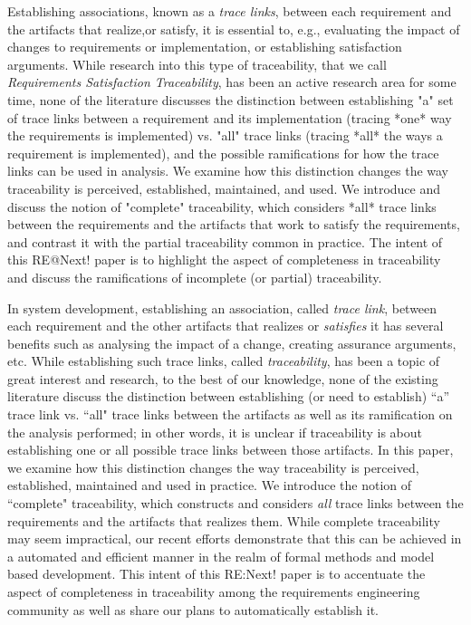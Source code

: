 Establishing associations, known as a\emph{ trace links}, between each requirement
and the artifacts that realize,or satisfy, it is essential to, e.g.,
evaluating the impact of changes to requirements or implementation, or
establishing satisfaction arguments. While research into this type of
traceability, that we call \emph{Requirements Satisfaction Traceability},
 has been an active research area for some time, none of the
literature discusses the distinction between establishing "a" set of trace
links between a requirement and its implementation (tracing *one* way the
requirements is implemented) vs. "all" trace links (tracing *all* the ways a
requirement is implemented), and the possible ramifications for how the trace
links can be used in analysis. We examine how this distinction changes the way
traceability is perceived, established, maintained, and used.  We introduce
and discuss the notion of "complete" traceability, which considers *all* trace
links between the requirements and the artifacts that work to satisfy the
requirements, and contrast it with the partial traceability common in
practice.  The intent of this RE@Next! paper is to highlight the aspect of
completeness in traceability and discuss the ramifications of incomplete (or
partial) traceability.

\iffalse

In system development, establishing an association, called \emph{trace link}, between each requirement and the other artifacts that realizes or \emph{satisfies} it has several benefits such as analysing the impact of a change, creating assurance arguments, etc. While establishing such trace links, called \emph{traceability}, has been a topic of great interest and research, to the best of our knowledge, none of the existing literature discuss the distinction between establishing (or need to establish) ``a'' trace link vs. ``all" trace links between the artifacts as well as its ramification on the analysis performed; in other words, it is unclear if traceability is about establishing one or all possible trace links between those artifacts. In this paper, we examine how this distinction changes the way traceability is perceived, established, maintained and used in practice.  We introduce the notion of ``complete" traceability, which constructs and considers {\em all} trace links between the requirements and the artifacts that realizes them. While complete traceability may seem impractical, our recent efforts demonstrate that this can be achieved in a automated and efficient manner in the realm of formal methods and model based development. This intent of this RE:Next! paper is to accentuate the aspect of completeness in traceability among the requirements engineering community as well as share our plans to automatically establish it.

